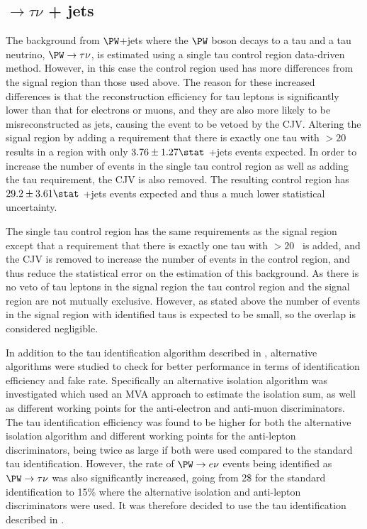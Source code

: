 \subsection{\PW$\rightarrow \tau\nu$ + jets}
\label{sec:promptwtaunu}
The background from $\PW$+jets where the $\PW$ boson decays to a tau and a tau neutrino, $\PW\rightarrow\tau\nu$, is estimated using a single tau control region data-driven method. However, in this case the control region used has more differences from the signal region than those used above. The reason for these increased differences is that the reconstruction efficiency for tau leptons is significantly lower than that for electrons or muons, and they are also more likely to be misreconstructed as jets, causing the event to be vetoed by the \ac{CJV}. Altering the signal region by adding a requirement that there is exactly one tau with \pt$>20$ \GeV\, results in a region with only $3.76\pm 1.27\stat$ \PW+jets events expected. In order to increase the number of events in the single tau control region as well as adding the tau requirement, the \ac{CJV} is also removed. The resulting control region has $29.2\pm 3.61\stat$ \PW+jets events expected and thus a much lower statistical uncertainty.

The single tau control region has the same requirements as the signal region except that a requirement that there is exactly one tau with \pt$>20$ \GeV\, is added, and the \ac{CJV} is removed to increase the number of events in the control region, and thus reduce the statistical error on the estimation of this background. As there is no veto of tau leptons in the signal region the tau control region and the signal region are not mutually exclusive. However, as stated above the number of events in the signal region with identified taus is expected to be small, so the overlap is considered negligible.

In addition to the tau identification algorithm described in , alternative algorithms were studied to check for better performance in terms of identification efficiency and fake rate. Specifically an alternative isolation algorithm was investigated which used an \ac{MVA} approach to estimate the isolation sum, as well as different working points for the anti-electron and anti-muon discriminators. The tau identification efficiency was found to be higher for both the alternative isolation algorithm and different working points for the anti-lepton discriminators, being twice as large if both were used compared to the standard tau identification. However, the rate of $\PW\rightarrow e\nu$ events being identified as $\PW\rightarrow\tau\nu$ was also significantly increased, going from 2\$ for the standard identification to 15\% where the alternative isolation and anti-lepton discriminators were used. It was therefore decided to use the tau identification described in .


